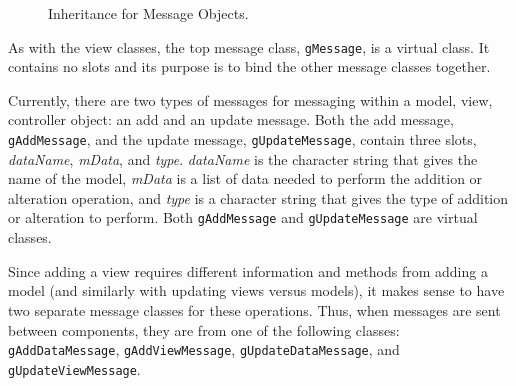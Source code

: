 \documentclass{article}[11pt]
\newcommand{\Robject}[1]{{\texttt{#1}}}
\newcommand{\Rslot}[1]{\textsl{#1}}
\begin{document}
\begin{figure}[ht]
  \begin{center}
    \caption{ Inheritance for Message Objects. }
    \label{Fig:Mess}
  \end{center}
\end{figure}

As with the view classes, the top message class, \Robject{gMessage}, is a
virtual class.  It contains no slots and its purpose is to bind the other
message classes together.

Currently, there are two types of messages for messaging within a model, view,
controller object: an add and an update message.  Both the add message,
\Robject{gAddMessage}, and the update message, \Robject{gUpdateMessage},
contain three slots, \Rslot{dataName}, \Rslot{mData}, and \Rslot{type}.
\Rslot{dataName} is the character string that gives the name of the model,
\Rslot{mData} is a list of data needed to perform the addition or alteration
operation, and \Rslot{type} is a character string that gives the type of
addition or alteration to perform.  Both \Robject{gAddMessage} and
\Robject{gUpdateMessage} are virtual classes. 

Since adding a view requires different information and methods from adding a
model (and similarly with updating views versus models), it makes sense to
have two separate message classes for these operations.  Thus, when messages
are sent between components, they are from one of the following classes:
\Robject{gAddDataMessage}, \Robject{gAddViewMessage},
\Robject{gUpdateDataMessage}, and \Robject{gUpdateViewMessage}.
\end{document}
